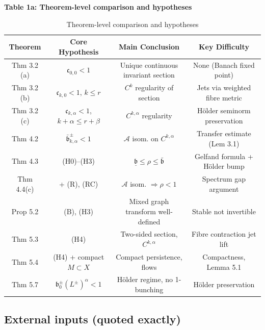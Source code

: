 \documentclass[11pt,a4paper]{article}
\theoremstyle{plain}
\theoremstyle{definition}
\theoremstyle{remark}
\numberwithin{equation}{section}
\numberwithin{figure}{section}
\begin{document}
\textbf{Table 1a: Theorem-level comparison and hypotheses}

\begin{table}[h]
\centering
\begin{tabular}{c|c|c|c}
\toprule
Theorem & Core Hypothesis & Main Conclusion & Key Difficulty\\
\midrule
Thm 3.2 (a) & $\mathfrak c_{0,0}<1$ & Unique continuous invariant section & None (Banach fixed point)\\
Thm 3.2 (b) & $\mathfrak c_{k,0}<1$, $k\le r$ & $C^k$ regularity of section & Jets via weighted fibre metric\\
Thm 3.2 (c) & $\mathfrak c_{k,\alpha}<1$, $k+\alpha\le r+\beta$ & $C^{k,\alpha}$ regularity & Hölder seminorm preservation\\
Thm 4.2 & $\bar{\mathfrak b}^\pm_{k,\alpha}<1$ & $\mathcal A$ isom. on $C^{k,\alpha}$ & Transfer estimate (Lem 3.1)\\
Thm 4.3 & (H0)–(H3) & $\underline{\mathfrak b}\le\rho\le\bar{\mathfrak b}$ & Gelfand formula + Hölder bump\\
Thm 4.4(c) & + (R), (RC) & $\mathcal A$ isom. $\Rightarrow\rho<1$ & Spectrum gap argument\\
Prop 5.2 & (B), (H3) & Mixed graph transform well-defined & Stable not invertible\\
Thm 5.3 & (H4) & Two-sided section, $C^{k,\alpha}$ & Fibre contraction jet lift\\
Thm 5.4 & (H4) + compact $M\subset X$ & Compact persistence, flows & Compactness, Lemma 5.1\\
Thm 5.7 & $\mathfrak b_0^\pm(L^\pm)^\alpha<1$ & Hölder regime, no 1-bunching & Hölder preservation\\
\bottomrule
\end{tabular}
\caption{Theorem-level comparison and hypotheses}
\label{tab:table1a}
\end{table}

\subsection{External inputs (quoted exactly)}
\end{document}
